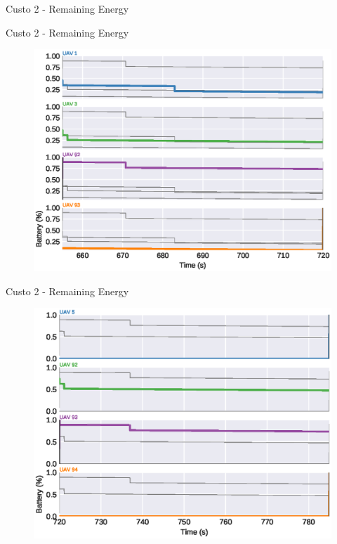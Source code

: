 \begin{frame}{Custo 2 - Remaining Energy}
\begin{figure}[!htb]
                    \end{figure}
                \end{frame}\begin{frame}{Custo 2 - Remaining Energy}
                    \begin{figure}[!htb]
                        \includegraphics[width=\textwidth]{custo_2/uav_remaining_energy_720.eps}
                    \end{figure}
                \end{frame}\begin{frame}{Custo 2 - Remaining Energy}
                    \begin{figure}[!htb]
                        \includegraphics[width=\textwidth]{custo_2/uav_remaining_energy_785.eps}

\end{figure}
\end{frame}
